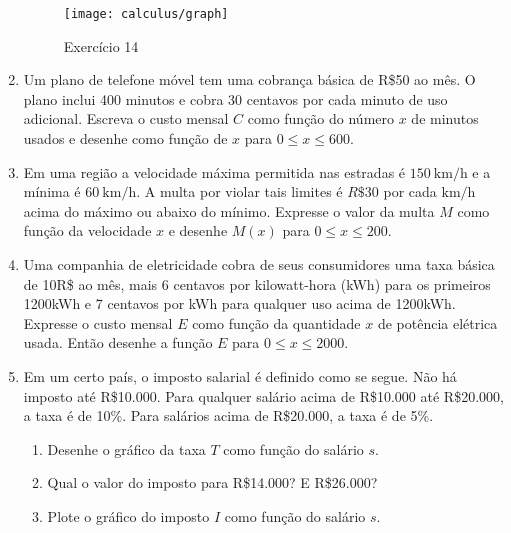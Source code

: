 \begin{enumerate}[label=\textbf{\arabic*.},leftmargin=*]
\begin{figure}[!ht]
\begin{minipage}{0.49\columnwidth}
      \label{fig:2-1-exercicio55}
    \end{minipage}
    \begin{minipage}{0.49\columnwidth}
      \texttt{[image: calculus/graph]}
      \caption{Exercício 14}
      \label{fig:2-1-exercicio56}
    \end{minipage}\vspace{-1.5cm}
  \end{figure}
  \item Um plano de telefone móvel tem uma cobrança básica de R\$50 ao mês. O plano inclui 400 minutos e cobra 30 centavos por cada minuto de uso adicional. Escreva o custo mensal $C$ como função do número $x$ de minutos usados e desenhe como função de $x$ para $0\leq x\leq 600$.
  \item Em uma região a velocidade máxima permitida nas estradas é $150~\si{\kilo\meter/\hour}$ e a mínima é $60~\si{\kilo\meter/\hour}$. A multa por violar tais limites é $R\$30$ por cada $\si{\kilo\meter/\hour}$ acima do máximo ou abaixo do mínimo. Expresse o valor da multa $M$ como função da velocidade $x$ e desenhe $M(x)$ para $0\leq x\leq 200$.
  \item Uma companhia de eletricidade cobra de seus consumidores uma taxa básica de 10R\$ ao mês, mais 6 centavos por kilowatt-hora (kWh) para os primeiros 1200kWh e 7 centavos por kWh para qualquer uso acima de 1200kWh. Expresse o custo mensal $E$ como função da quantidade $x$ de potência elétrica usada. Então desenhe a função $E$ para $0\leq x\leq 2000$.
  \item[\difficultQuestion] Em um certo país, o imposto salarial é definido como se segue. Não há imposto até R\$10.000. Para qualquer salário acima de R\$10.000 até R\$20.000, a taxa é de 10\%. Para salários acima de R\$20.000, a taxa é de 5\%.
  \begin{enumerate}
    \item Desenhe o gráfico da taxa $T$ como função do salário $s$.
    \item Qual o valor do imposto para R\$14.000? E R\$26.000?
    \item Plote o gráfico do imposto $I$ como função do salário $s$.
  \end{enumerate}
  \begin{tabular}{@{}m{}m{}@{}}

\end{tabular}
\end{enumerate}
